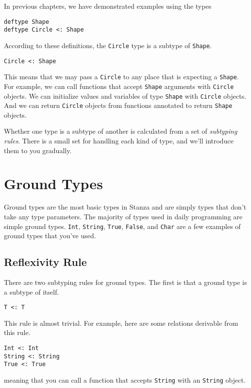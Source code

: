 \documentclass[10pt,oneside]{book}
\begin{document}
In previous chapters, we have demonstrated examples using the types
\begin{lstlisting}
deftype Shape
deftype Circle <: Shape
\end{lstlisting}
According to these definitions, the \texttt{\frenchspacing Circle} type is a subtype of \texttt{\frenchspacing Shape}.
\begin{lstlisting}
Circle <: Shape
\end{lstlisting}
This means that we may pass a \texttt{\frenchspacing Circle} to any place that is expecting a \texttt{\frenchspacing Shape}. For example, we can call functions that accept \texttt{\frenchspacing Shape} arguments with \texttt{\frenchspacing Circle} objects. We can initialize values and variables of type \texttt{\frenchspacing Shape} with \texttt{\frenchspacing Circle} objects. And we can return \texttt{\frenchspacing Circle} objects from functions annotated to return \texttt{\frenchspacing Shape} objects.

Whether one type is a subtype of another is calculated from a set of {\em subtyping rules}. There is a small set for handling each kind of type, and we'll introduce them to you gradually.

\section{Ground Types}
Ground types are the most basic types in Stanza and are simply types that don't take any type parameters. The majority of types used in daily programming are simple ground types. \texttt{\frenchspacing Int}, \texttt{\frenchspacing String}, \texttt{\frenchspacing True}, \texttt{\frenchspacing False}, and \texttt{\frenchspacing Char} are a few examples of ground types that you've used.

\subsection*{Reflexivity Rule}
There are two subtyping rules for ground types. The first is that a ground type is a subtype of itself.
\begin{lstlisting}
T <: T
\end{lstlisting}
This rule is almost trivial. For example, here are some relations derivable from this rule.
\begin{lstlisting}
Int <: Int
String <: String
True <: True
\end{lstlisting}
meaning that you can call a function that accepts \texttt{\frenchspacing String} with an \texttt{\frenchspacing String} object.
\end{document}
